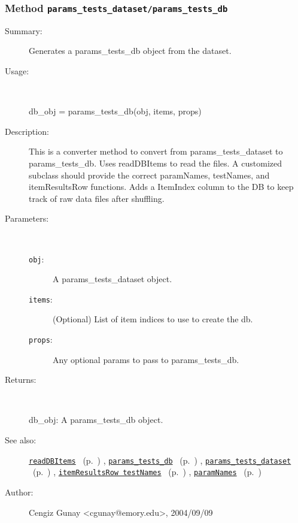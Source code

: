 \subsubsection[Method \texttt{params\_tests\_db}]{Method \texttt{params\_tests\_dataset/params\_tests\_db}}%
%
\label{ref_params_tests_dataset__params_tests_db}%
\hypertarget{ref_params_tests_dataset__params_tests_db}{}%
\begin{description}
\item[Summary:]Generates a params\_tests\_db object from the dataset.
%
\item[Usage:]~%
\begin{lyxcode}%
db\_obj = params\_tests\_db(obj, items, props)
%
\end{lyxcode}%
%
\item[Description:]%
This is a converter method to convert from params\_tests\_dataset to
 params\_tests\_db. Uses readDBItems to read the files.
 A customized subclass should provide the correct 
 paramNames, testNames, and itemResultsRow functions. Adds a ItemIndex
 column to the DB to keep track of raw data files after shuffling.
\item[Parameters:]~
\begin{description}%
\item[\texttt{obj}:]
 A params\_tests\_dataset object.
\item[\texttt{items}:]
 (Optional) List of item indices to use to create the db.
\item[\texttt{props}:]
 Any optional params to pass to params\_tests\_db.
\end{description}%
%
\item[Returns:]~

	db\_obj: A params\_tests\_db object.
%
%
\item[See also:]%
\hyperlink{ref_readDBItems}{\texttt{readDBItems}}%
\ (p.~\pageref{ref_readDBItems})%
%
, \hyperlink{ref_params_tests_db}{\texttt{params\_tests\_db}}%
\ (p.~\pageref{ref_params_tests_db})%
%
, \hyperlink{ref_params_tests_dataset}{\texttt{params\_tests\_dataset}}%
\ (p.~\pageref{ref_params_tests_dataset})%
%
, \hyperlink{ref_itemResultsRow
	    testNames}{\texttt{itemResultsRow
	    testNames}}%
\ (p.~\pageref{ref_itemResultsRow
	    testNames})%
%
, \hyperlink{ref_paramNames}{\texttt{paramNames}}%
\ (p.~\pageref{ref_paramNames})%
%
%
\item[Author:]%
Cengiz Gunay <cgunay@emory.edu>, 2004/09/09%
\end{description}
\methodline%
